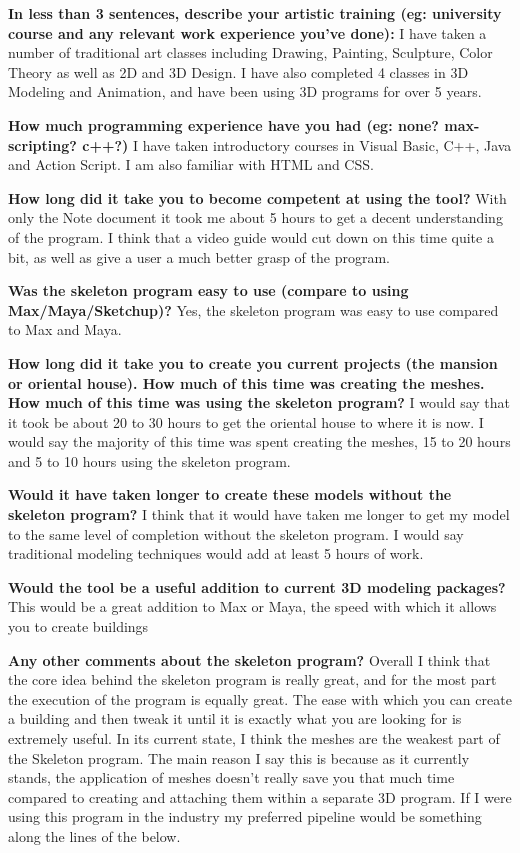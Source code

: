 {\bf In less than 3 sentences, describe your artistic training (eg: university course and any relevant work experience you've done):}
I have taken a number of traditional art classes including Drawing, Painting, Sculpture, Color Theory as well as 2D and 3D Design. I have also completed 4 classes in 3D Modeling and Animation, and have been using 3D programs for over 5 years. 

{\bf How much programming experience have you had (eg: none? max-scripting? c++?)}
I have taken introductory courses in Visual Basic, C++, Java and Action Script. I am also familiar with HTML and CSS.

{\bf How long did it take you to become competent at using the tool?}
With only the Note document it took me about 5 hours to get a decent understanding of the program. I think that a video guide would cut down on this time quite a bit, as well as give a user a much better grasp of the program.

{\bf Was the skeleton program easy to use (compare to using Max/Maya/Sketchup)?}
Yes, the skeleton program was easy to use compared to Max and Maya.

{\bf How long did it take you to create you current projects (the mansion or oriental house). How much of this time was creating the meshes. How much of this time was using the skeleton program?}
I would say that it took be about 20 to 30 hours to get the oriental house to where it is now.
I would say the majority of this time was spent creating the meshes, 15 to 20 hours and 5 to 10 hours using the skeleton program.


{\bf Would it have taken longer to create these models without the skeleton program?}
I think that it would have taken me longer to get my model to the same level of completion without the skeleton program. I would say traditional modeling techniques would add at least 5 hours of work.

{\bf Would the tool be a useful addition to current 3D modeling packages?}
This would be a great addition to Max or Maya, the speed with which it allows you to create buildings 

{\bf Any other comments about the skeleton program?}
Overall I think that the core idea behind the skeleton program is really great, and for the most part the execution of the program is equally great. The ease with which you can create a building and then tweak it until it is exactly what you are looking for is extremely useful.
In its current state, I think the meshes are the weakest part of the Skeleton program. The main reason I say this is because as it currently stands, the application of meshes doesn’t really save you that much time compared to creating and attaching them within a separate 3D program.
If I were using this program in the industry my preferred pipeline would be something along the lines of the below.

